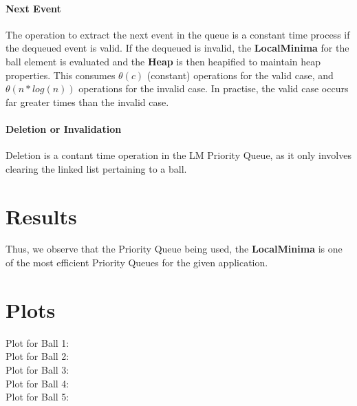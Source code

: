 \documentclass[12pt]{article}
\begin{document}
\paragraph{Next Event}
The operation to extract the next event in the queue is a constant time process if the dequeued event is valid. If the dequeued is invalid, the \textbf{LocalMinima} for the ball element is evaluated and the \textbf{Heap} is then heapified to maintain heap properties. This consumes $\theta(c)$ (constant) operations for the valid case, and $\theta(n * log(n))$ operations for the invalid case. In practise, the valid case occurs far greater times than the invalid case.\\
 
\paragraph{Deletion or Invalidation}
Deletion is a contant time operation in the LM Priority Queue, as it only involves clearing the linked list pertaining to a ball.

\section{Results}\label{results}
Thus, we observe that the Priority Queue being used, the \textbf{LocalMinima} is one of the most efficient Priority Queues for the given application.

\section{Plots}\label{plots}
Plot for Ball 1:\\

Plot for Ball 2:\\

Plot for Ball 3:\\

Plot for Ball 4:\\

Plot for Ball 5:\\

\end{document}
